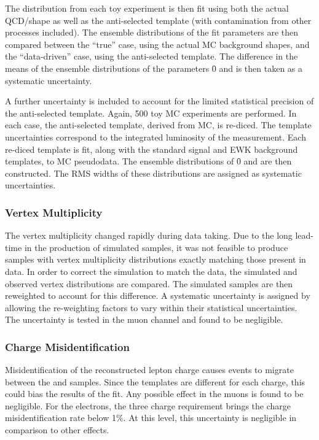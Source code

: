 The \LP distribution from each toy experiment is then fit using both the actual
\ac{QCD}/\gammajets shape as well as the anti-selected template (with
contamination from other processes included). The ensemble distributions of the
fit parameters are then compared between the ``true'' case, using the actual
\ac{MC} background shapes, and the ``data-driven'' case, using the anti-selected
template. The difference in the means of the ensemble distributions of the
parameters \f0 and \fLmfR is then taken as a systematic uncertainty.

A further uncertainty is included to account for the limited statistical
precision of the anti-selected template. Again, 500 toy \ac{MC} experiments are
performed. In each case, the anti-selected template, derived from \ac{MC}, is
re-diced. The template uncertainties correspond to the integrated luminosity of
the measurement. Each re-diced template is fit, along with the standard signal
and \ac{EWK} background templates, to \ac{MC} pseudodata. The ensemble
distributions of \f0 and \fLmfR are then constructed. The \ac{RMS} widths of
these distributions are assigned as systematic uncertainties.

\subsubsection{Vertex Multiplicity}
The vertex multiplicity changed rapidly during data taking. Due to the long
lead-time in the production of simulated samples, it was not feasible to produce
samples with vertex multiplicity distributions exactly matching those present in
data. In order to correct the simulation to match the data, the simulated and
observed vertex distributions are compared. The simulated samples are then
reweighted to account for this difference. A systematic uncertainty is assigned
by allowing the re-weighting factors to vary within their statistical
uncertainties. The uncertainty is tested in the muon channel and found to be
negligible.

\subsubsection{Charge Misidentification}
\label{sec:wpol_syst_charge_misid}
Misidentification of the reconstructed lepton charge causes events to migrate
between the \PWp and \PWm samples. Since the templates are different for each
charge, this could bias the results of the fit. Any possible effect in the muons
is found to be negligible. For the electrons, the three charge requirement
brings the charge misidentification rate below 1\%. At this level, this
uncertainty is negligible in comparison to other effects.

